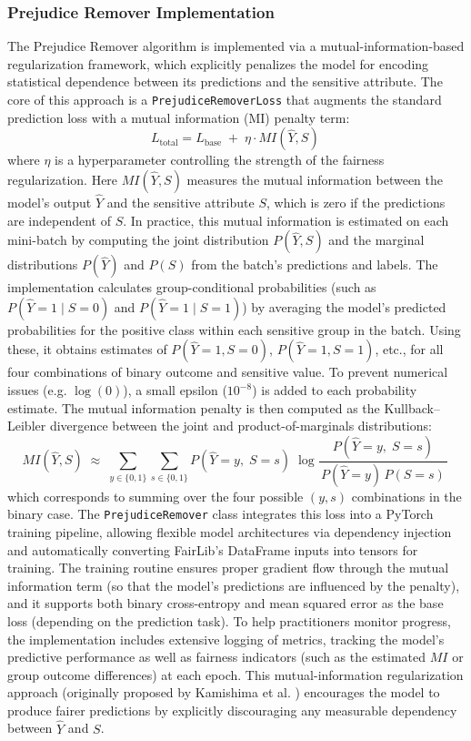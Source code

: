 \documentclass[12pt,a4paper,openright,twoside]{book}
\begin{document}
\subsubsection{Prejudice Remover Implementation}
The Prejudice Remover algorithm is implemented via a mutual-information-based regularization framework, which explicitly penalizes the model for encoding statistical dependence between its predictions and the sensitive attribute. The core of this approach is a \texttt{PrejudiceRemoverLoss} that augments the standard prediction loss with a mutual information (MI) penalty term:
\begin{equation}
    L_{\text{total}} = L_{\text{base}} \;+\; \eta \cdot MI(\hat{Y}, S)\,
\end{equation}
where $\eta$ is a hyperparameter controlling the strength of the fairness regularization. Here $MI(\hat{Y}, S)$ measures the mutual information between the model’s output $\hat{Y}$ and the sensitive attribute $S$, which is zero if the predictions are independent of $S$. In practice, this mutual information is estimated on each mini-batch by computing the joint distribution $P(\hat{Y}, S)$ and the marginal distributions $P(\hat{Y})$ and $P(S)$ from the batch’s predictions and labels. The implementation calculates group-conditional probabilities (such as $P(\hat{Y}=1 \mid S=0)$ and $P(\hat{Y}=1 \mid S=1)$) by averaging the model’s predicted probabilities for the positive class within each sensitive group in the batch. Using these, it obtains estimates of $P(\hat{Y}=1, S=0)$, $P(\hat{Y}=1, S=1)$, etc., for all four combinations of binary outcome and sensitive value. To prevent numerical issues (e.g. $\log(0)$), a small epsilon ($10^{-8}$) is added to each probability estimate. The mutual information penalty is then computed as the Kullback–Leibler divergence between the joint and product-of-marginals distributions:
\begin{equation}
    MI(\hat{Y}, S) \;\approx\; \sum_{y\in\{0,1\}} \sum_{s\in\{0,1\}} P(\hat{Y}=y,\;S=s)\; \log \frac{P(\hat{Y}=y,\;S=s)}{\,P(\hat{Y}=y)\,P(S=s)\,}\,
\end{equation}
which corresponds to summing over the four possible $(y, s)$ combinations in the binary case. The \texttt{PrejudiceRemover} class integrates this loss into a PyTorch training pipeline, allowing flexible model architectures via dependency injection and automatically converting FairLib’s DataFrame inputs into tensors for training. The training routine ensures proper gradient flow through the mutual information term (so that the model’s predictions are influenced by the penalty), and it supports both binary cross-entropy and mean squared error as the base loss (depending on the prediction task). To help practitioners monitor progress, the implementation includes extensive logging of metrics, tracking the model’s predictive performance as well as fairness indicators (such as the estimated $MI$ or group outcome differences) at each epoch. This mutual-information regularization approach (originally proposed by Kamishima et al. \cite{kamishima2012prejudiceremoverregularizer}) encourages the model to produce fairer predictions by explicitly discouraging any measurable dependency between $\hat{Y}$ and $S$.
\end{document}
